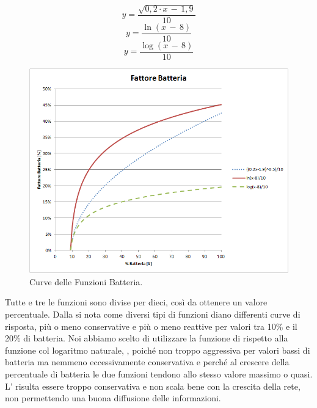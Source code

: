 \begin{equation}
	\label{eq:df_bat_radq}
	y=\dfrac{\sqrt{0,2\cdot x\,-\,1,9}}{10}
\end{equation}
\begin{equation}
	\label{eq:df_bat_ln}
	y=\dfrac{\ln\left(x\,-\,8\right) }{10}
\end{equation}
\begin{equation}
	\label{eq:df_bat_log}
	y=\dfrac{\log\left(x\,-\,8\right) }{10}
\end{equation}

\begin{figure}[tb]
	\centering
	\includegraphics[width=0.9\linewidth, keepaspectratio]{Images/grafici_usati/DF_battery_factor}
	\caption[DF fattore batteria.]{Curve delle Funzioni Batteria.}
	\label{fig:DF_battery_factor}
\end{figure}
Tutte e tre le funzioni sono divise per dieci, così da ottenere un valore percentuale. Dalla  si nota come diversi tipi di funzioni diano differenti curve di risposta, più o meno conservative e più o meno reattive per valori tra 10\% e il 20\% di batteria. Noi abbiamo scelto di utilizzare la funzione di  rispetto alla funzione col logaritmo naturale, , poiché non troppo aggressiva per valori bassi di batteria ma nemmeno eccessivamente conservativa e perché al crescere della percentuale di batteria le due funzioni tendono allo stesso valore massimo o quasi. L' risulta essere troppo conservativa e non scala bene con la crescita della rete, non permettendo una buona diffusione delle informazioni.
\medskip

